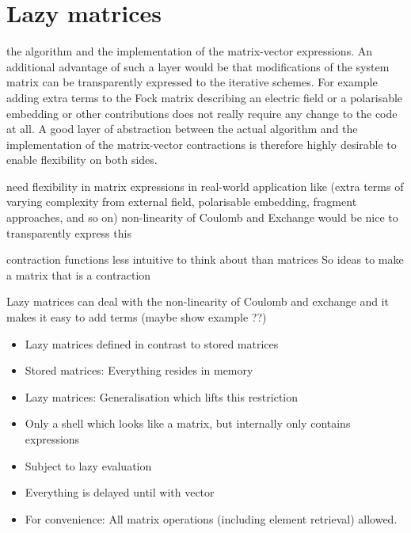 \section{Lazy matrices}



the \SCF algorithm
and the implementation of the matrix-vector \contraction expressions.
An additional advantage of such a layer would be that
modifications of the system matrix can be transparently expressed
to the iterative schemes.
For example adding extra terms to the Fock matrix
describing an electric field or a polarisable embedding
or other contributions does not really require
any change to the \SCF code at all.
A good layer of abstraction between the actual \SCF algorithm
and the implementation of the matrix-vector contractions
is therefore highly desirable to enable flexibility on both sides.

need flexibility in matrix expressions in real-world application
like \SCF (extra terms of varying complexity from external field,
polarisable embedding, fragment approaches, and so on)
non-linearity of Coulomb and Exchange
would be nice to transparently express this



contraction functions less intuitive to think about
than matrices
So ideas to make a matrix that is a contraction



Lazy matrices can deal with the non-linearity of Coulomb and exchange
and it makes it easy to add terms (maybe show example ??)



\begin{itemize}
	\item Lazy matrices defined in contrast to stored matrices
	\item Stored matrices: Everything resides in memory
	\item Lazy matrices: Generalisation which lifts this restriction
	\item Only a shell which looks like a matrix, but internally only contains expressions
	\item Subject to lazy evaluation
	\item Everything is delayed until \contraction with vector
	\item For convenience: All matrix operations (including element retrieval) allowed.
\end{itemize}

